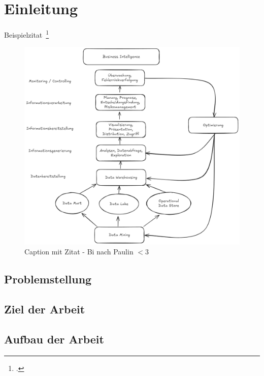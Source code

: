 \clearpage
{}
\section{Einleitung}
Beispielzitat~\footcite[vgl.S.1]{example}

\begin{figure}[H]
    \includegraphics[width=\textwidth]{Images/BI.png}
    \caption[Caption ohne Zitat]{Caption mit Zitat - Bi nach Paulin $<3$}
    \label{fig:BI}
\end{figure}

\subsection{Problemstellung}
\subsection{Ziel der Arbeit}

\subsection{Aufbau der Arbeit}
